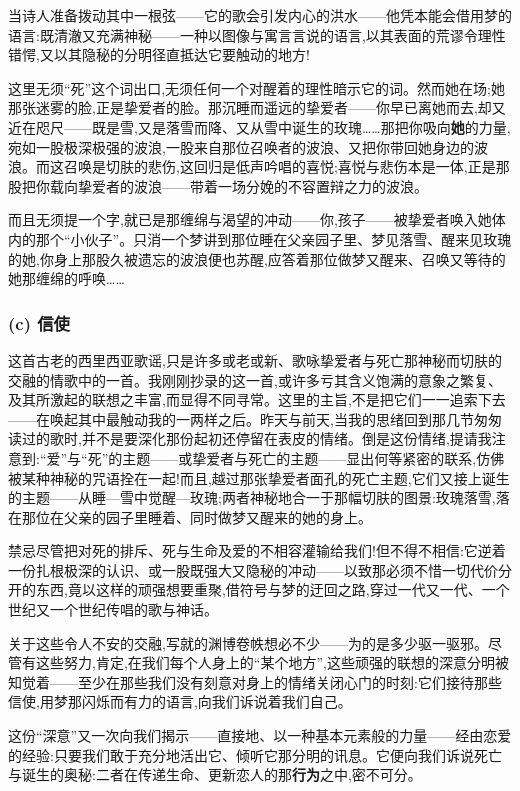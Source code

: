 当诗人准备拨动其中一根弦——它的歌会引发内心的洪水——他凭本能会借用梦的语言:既清澈又充满神秘——一种以图像与寓言言说的语言,以其表面的荒谬令理性错愕,又以其隐秘的分明径直抵达它要触动的地方!

这里无须“死”这个词出口,无须任何一个对醒着的理性暗示它的词。然而她在场;她那张迷雾的脸,正是挚爱者的脸。那沉睡而遥远的挚爱者——你早已离她而去,却又近在咫尺——既是雪,又是落雪而降、又从雪中诞生的玫瑰……那把你吸向\textbf{她}的力量,宛如一股极深极强的波浪,一股来自那位召唤者的波浪、又把你带回她身边的波浪。而这召唤是切肤的悲伤,这回归是低声吟唱的喜悦;喜悦与悲伤本是一体,正是那股把你载向挚爱者的波浪——带着一场分娩的不容置辩之力的波浪。

而且无须提一个字,就已是那缠绵与渴望的冲动——你,孩子——被挚爱者唤入她体内的那个“小伙子”。只消一个梦讲到那位睡在父亲园子里、梦见落雪、醒来见玫瑰的她,你身上那股久被遗忘的波浪便也苏醒,应答着那位做梦又醒来、召唤又等待的她那缠绵的呼唤……

\subsubsection*{(c) 信使}
\label{ch18:local:h19}

\label{ch18:local:n17}

这首古老的西里西亚歌谣,只是许多或老或新、歌咏挚爱者与死亡那神秘而切肤的交融的情歌中的一首。我刚刚抄录的这一首,或许多亏其含义饱满的意象之繁复、及其所激起的联想之丰富,而显得不同寻常。这里的主旨,不是把它们一一追索下去——在唤起其中最触动我的一两样之后。昨天与前天,当我的思绪回到那几节匆匆读过的歌时,并不是要深化那份起初还停留在表皮的情绪。倒是这份情绪,提请我注意到:“爱”与“死”的主题——或挚爱者与死亡的主题——显出何等紧密的联系,仿佛被某种神秘的咒语拴在一起!而且,越过那张挚爱者面孔的死亡主题,它们又接上诞生的主题——从睡—雪中觉醒—玫瑰;两者神秘地合一于那幅切肤的图景:玫瑰落雪,落在那位在父亲的园子里睡着、同时做梦又醒来的她的身上。

禁忌尽管把对死的排斥、死与生命及爱的不相容灌输给我们!但不得不相信:它逆着一份扎根极深的认识、或一股既强大又隐秘的冲动——以致那必须不惜一切代价分开的东西,竟以这样的顽强想要重聚,借符号与梦的迂回之路,穿过一代又一代、一个世纪又一个世纪传唱的歌与神话。

关于这些令人不安的交融,写就的渊博卷帙想必不少——为的是多少驱一驱邪。尽管有这些努力,肯定,在我们每个人身上的“某个地方”,这些顽强的联想的深意分明被知觉着——至少在那些我们没有刻意对身上的情绪关闭心门的时刻:它们接待那些信使,用梦那闪烁而有力的语言,向我们诉说着我们自己。

这份“深意”又一次向我们揭示——直接地、以一种基本元素般的力量——经由恋爱的经验:只要我们敢于充分地活出它、倾听它那分明的讯息。它便向我们诉说死亡与诞生的奥秘:二者在传递生命、更新恋人的那\textbf{行为}之中,密不可分。

